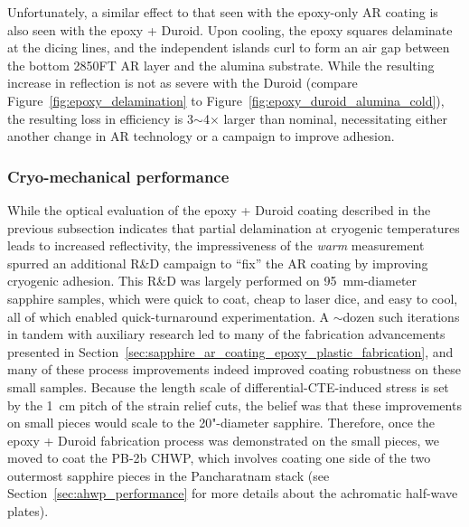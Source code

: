 Unfortunately, a similar effect to that seen with the epoxy-only AR coating is also seen with the epoxy + Duroid. Upon cooling, the epoxy squares delaminate at the dicing lines, and the independent islands curl to form an air gap between the bottom 2850FT AR layer and the alumina substrate. While the resulting increase in reflection is not as severe with the Duroid (compare Figure~\ref{fig:epoxy_delamination} to Figure~\ref{fig:epoxy_duroid_alumina_cold}), the resulting loss in efficiency is 3$\sim$4$\times$ larger than nominal, necessitating either another change in AR technology or a campaign to improve adhesion.


\subsubsection{Cryo-mechanical performance}
\label{sec:sapphire_ar_coating_epoxy_plastic_duroid_cryo_mechanical_performance}

While the optical evaluation of the epoxy + Duroid coating described in the previous subsection indicates that partial delamination at cryogenic temperatures leads to increased reflectivity, the impressiveness of the \textit{warm} measurement spurred an additional R\&D campaign to ``fix'' the AR coating by improving cryogenic adhesion. This R\&D was largely performed on 95~mm-diameter sapphire samples, which were quick to coat, cheap to laser dice, and easy to cool, all of which enabled quick-turnaround experimentation. A $\sim$dozen such iterations in tandem with auxiliary research led to many of the fabrication advancements presented in Section~\ref{sec:sapphire_ar_coating_epoxy_plastic_fabrication}, and many of these process improvements indeed improved coating robustness on these small samples. Because the length scale of differential-CTE-induced stress is set by the 1~cm pitch of the strain relief cuts, the belief was that these improvements on small pieces would scale to the 20"-diameter sapphire. Therefore, once the epoxy + Duroid fabrication process was demonstrated on the small pieces, we moved to coat the PB-2b CHWP, which involves coating one side of the two outermost sapphire pieces in the Pancharatnam stack (see Section~\ref{sec:ahwp_performance} for more details about the achromatic half-wave plates).

